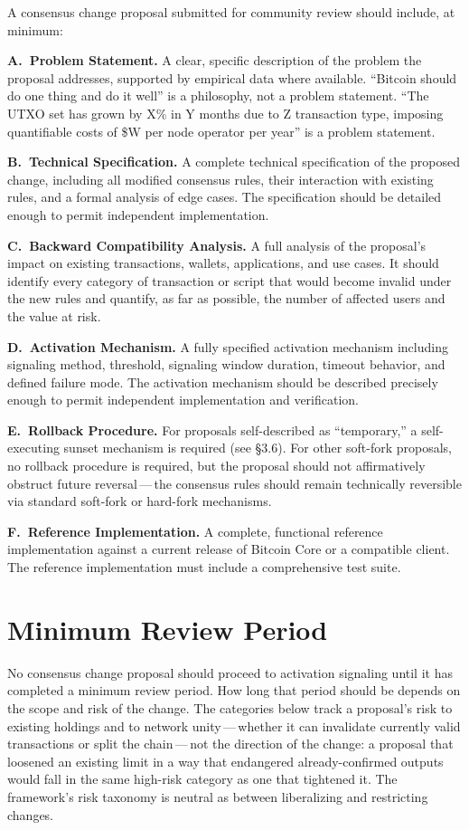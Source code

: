 \documentclass[11pt, twoside, openright]{book}
\newcommand{\reqitem}[2]{\medskip\noindent\textbf{#1\ #2}\quad\ignorespaces}
\newcommand{\sect}[1]{\S#1}
\begin{document}
A consensus change proposal submitted for community review should include, at minimum:

\reqitem{A.}{Problem Statement.} A clear, specific description of the problem the proposal addresses, supported by empirical data where available. ``Bitcoin should do one thing and do it well'' is a philosophy, not a problem statement. ``The UTXO set has grown by X\% in Y months due to Z transaction type, imposing quantifiable costs of \$W per node operator per year'' is a problem statement.

\reqitem{B.}{Technical Specification.} A complete technical specification of the proposed change, including all modified consensus rules, their interaction with existing rules, and a formal analysis of edge cases. The specification should be detailed enough to permit independent implementation.

\reqitem{C.}{Backward Compatibility Analysis.} A full analysis of the proposal's impact on existing transactions, wallets, applications, and use cases. It should identify every category of transaction or script that would become invalid under the new rules and quantify, as far as possible, the number of affected users and the value at risk.

\reqitem{D.}{Activation Mechanism.} A fully specified activation mechanism including signaling method, threshold, signaling window duration, timeout behavior, and defined failure mode. The activation mechanism should be described precisely enough to permit independent implementation and verification.

\reqitem{E.}{Rollback Procedure.} For proposals self-described as ``temporary,'' a self-executing sunset mechanism is required (see \sect{3.6}). For other soft-fork proposals, no rollback procedure is required, but the proposal should not affirmatively obstruct future reversal\,---\,the consensus rules should remain technically reversible via standard soft-fork or hard-fork mechanisms.

\reqitem{F.}{Reference Implementation.} A complete, functional reference implementation against a current release of Bitcoin Core or a compatible client. The reference implementation must include a comprehensive test suite.

\section{Minimum Review Period}

No consensus change proposal should proceed to activation signaling until it has completed a minimum review period. How long that period should be depends on the scope and risk of the change. The categories below track a proposal's risk to existing holdings and to network unity\,---\,whether it can invalidate currently valid transactions or split the chain\,---\,not the direction of the change: a proposal that loosened an existing limit in a way that endangered already-confirmed outputs would fall in the same high-risk category as one that tightened it. The framework's risk taxonomy is neutral as between liberalizing and restricting changes.
\end{document}
